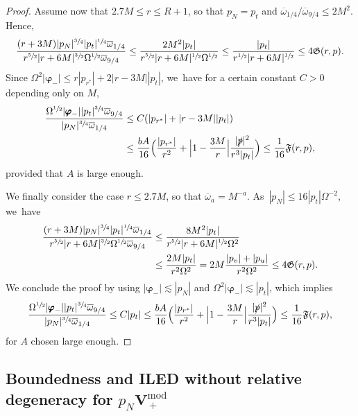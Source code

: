 \documentclass[JEP,XML,SOM,Unicode,published]{cedram}
\theoremstyle{plain}
\theoremstyle{definition}
\begin{document}
\begin{proof}
Assume now that $2.7M \leq r \leq R+1$, so that $p_N=p_t$ and $\overline{\omega}_{1/4} /\overline{\omega}_{9/4} \leq 2M^2$. Hence,\vspace*{-3pt}
\[
\frac{(r+3M)|p_N|^{\sfrac{3}{4}} |p_t|^{\sfrac{1}{4}}\overline{\omega}_{1/4} }{r^{\sfrac{5}{2}}|r+6M|^{\sfrac{3}{2}}\Omega^{\sfrac{1}{2}} \overline{\omega}_{9/4}} \leq \frac{2M^2 |p_t| }{r^{\sfrac{5}{2}}|r+6M|^{\sfrac{1}{2}}\Omega^{\sfrac{1}{2}} } \leq \frac{|p_t|}{r^{\sfrac{1}{2}}|r+6M|^{\sfrac{1}{2}}} \leq 4 \mathfrak{G}(r,p).
\]
Since $\Omega^2|\pmb{\varphi}_-| \leq r|p_{r^*}|+2|r-3M||p_t|$, we~have for a certain constant $C>0$ depending only on $M$,\vspace*{-3pt}
\begin{align*}
\frac{ \Omega^{\sfrac{1}{2}}|\pmb{\varphi}_-||p_t|^{\sfrac{3}{4}}\overline{\omega}_{9/4}}{ |p_N|^{\sfrac{3}{4}}\overline{\omega}_{1/4}} &\leq C(|p_{r^*}|+|r-3M||p_t|)\\
&\leq \frac{bA}{16} \Bigl(\frac{|p_{r^*}|}{r^2}+ \Bigl |1-\frac{3M}{r} \Bigr| \frac{|\slashed{p}|^2}{r^3 |p_t|} \Bigr) \leq \frac{1}{16} \mathfrak{F}(r,p),
\end{align*}
provided that $A$ is large enough.

We finally consider the case $r \leq 2.7M$, so that $\overline{\omega}_{a}=M^{-a}$. As~$|p_N| \leq 16|p_t|\Omega^{-2}$, we~have\vspace*{-3pt}
\begin{align*}
\frac{(r+3M)|p_N|^{\sfrac{3}{4}} |p_t|^{\sfrac{1}{4}}\overline{\omega}_{1/4} }{r^{\sfrac{5}{2}}|r+6M|^{\sfrac{3}{2}}\Omega^{\sfrac{1}{2}} \overline{\omega}_{9/4}} &\leq \frac{8 M^2|p_t|}{r^{\sfrac{5}{2}}|r+6M|^{\sfrac{1}{2}}\Omega^2}\\
&\leq \frac{2M|p_t|}{r^2\Omega^2} = 2M \frac{|p_v|+|p_u|}{r^2\Omega^2} \leq 4 \mathfrak{G}(r,p).
\end{align*}
We conclude the proof by using $|\pmb{\varphi}_-| \lesssim |p_N|$ and $\Omega^2|\pmb{\varphi}_-|\lesssim |p_t|$, which implies
\[
\frac{ \Omega^{\sfrac{1}{2}}|\pmb{\varphi}_-||p_t|^{\sfrac{3}{4}}\overline{\omega}_{9/4}}{ |p_N|^{\sfrac{3}{4}}\overline{\omega}_{1/4}} \leq C |p_t| \leq \frac{bA}{16} \Bigl(\frac{|p_{r^*}|}{r^2}+ \Bigl |1-\frac{3M}{r} \Bigr | \frac{|\slashed{p}|^2}{r^3 |p_t|} \Bigr) \leq \frac{1}{16} \mathfrak{F}(r,p),
\]
for $A$ chosen large enough.
\end{proof}

\subsection{Boundedness and ILED without relative degeneracy for $p_N \pmb{V}_{\, +}^{\mathrm{mod}}$}\label{Subsec74}
\end{document}
